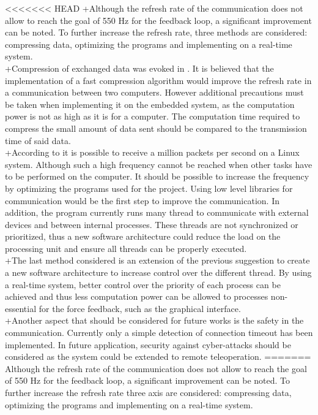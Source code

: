 <<<<<<< HEAD
+Although the refresh rate of the communication does not allow to reach the goal of 550 Hz for the feedback loop, a significant improvement can be noted.  To further increase the refresh rate, three methods are considered: compressing data, optimizing the programs and implementing on a real-time system.\\
 +Compression of exchanged data was evoked in . It is believed that the implementation of a fast compression algorithm would improve the refresh rate in a communication between two computers. However additional precautions must be taken when implementing it on the embedded system, as the computation power is not as high as it is for a computer. The computation time required to compress the small amount of data sent should be compared to the transmission time of said data.\\
 +According to \cite{million_packets} it is possible to receive a million packets per second on a Linux system. Although such a high frequency cannot be reached when other tasks have to be performed on the computer. It should be possible to increase the frequency by optimizing the programs used for the project. Using low level libraries for communication would be the first step to improve the communication. In addition, the program currently runs many thread to communicate with external devices and between internal processes. These threads are not synchronized or prioritized, thus a new software architecture could reduce the load on the processing unit and ensure all threads can be properly executed.\\
 +The last method considered is an extension of the previous suggestion to create a new software architecture to increase control over the different thread. By using a real-time system, better control over the priority of each process can be achieved and thus less computation power can be allowed to processes non-essential for the force feedback, such as the graphical interface.\\
 +Another aspect that should be considered for future works is the safety in the communication. Currently only a simple detection of connection timeout has been implemented. In future application, security against cyber-attacks should be considered as the system could be extended to remote teleoperation.
=======
Although the refresh rate of the communication does not allow to reach the goal of 550 Hz for the feedback loop, a significant improvement can be noted.  To further increase the refresh rate three axis are considered: compressing data, optimizing the programs and implementing on a real-time system.\\
